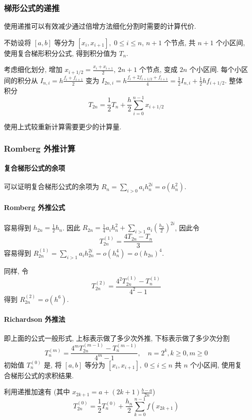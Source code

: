 \documentclass{ctexart}
\begin{document}
\subsubsection{梯形公式的递推}
    使用递推可以有效减少通过倍增方法细化分割时需要的计算代价.\par
    不妨设将 $[a,b]$ 等分为 $[x_i, x_{i+1}],\;0\le i\le n$, $n+1$ 个节点, 共 $n+1$ 个小区间,
    使用复合梯形积分公式, 得到积分值为 $T_n$.\par
    考虑细化划分, 增加 $x_{i+1/2} = \frac{x_i + x_{i+1}}{2}$, $2n+1$ 个节点, 变成 $2n$ 个小区间.
    每个小区间的积分从 $I_{n,i} = h \frac{f_i + f_{i+1}}{2}$ 变为 
    $I_{2n,i} = h\frac{f_i + 2 f_{i + 1/2} + f_{i+1}}{4} = \frac{1}{2} I_{n,i} + \frac{1}{2} h f_{i+1/2}$.
    整体积分 \[
        T_{2n} = \frac{1}{2} T_n + \frac{h}{2} \sum_{i=0}^{n-1} x_{i+1/2}\]
    \par
    使用上式较重新计算需要更少的计算量.
\subsubsection{Romberg 外推计算}
\paragraph{复合梯形公式的余项}
    可以证明复合梯形公式的余项为 $R_n = \sum_{i > 0} a_i h_n^{2 i} = o(h_n^2)$.
\paragraph{Romberg 外推公式}
    容易得到 $h_{2n} = \frac{1}{2} h_n$. 因此 
    $R_{2n} = \frac{1}{4} a_i h_n^2 + \sum_{i>1} a_i \left(\frac{h_n}{2}\right)^{2 i}$,
    因此令 \[
        T^{(1)}_{2n} = \frac{4 T_{2n} - T_n}{3}\]
    容易得到 $R^{(1)}_{2n} = \sum_{i > 1} a_i h_{2n}^{2 i} = o(h_n^4) = o(h_{2n})^4$.\par
    同样, 令 \[
        T^{(2)}_{2n} = \frac{4^2 T^{(1)}_{2n} - T^{(1)}_n}{4^2 - 1}\]
    得到 $R^{(2)}_{2n} = o(h^6)$.
\paragraph{Richardson 外推法}
    即上面的公式一般形式, 上标表示做了多少次外推, 下标表示做了多少次分割 \[
        T^{(m)}_n = \frac{4^m T^{(m-1)}_{2n} - T^{(m-1)}_n}{4^m -1},\quad n = 2^k, k \ge 0, m \ge 0\]
    初始值 $ T^{(0)}_n $ 是, 将 $[a,b]$ 等分为 $[x_i, x_{i+1}],\;0\le i \le n$ 共 $n$ 个小区间,
    使用复合梯形公式的求积结果.\par
    利用递推加速有 (其中 $x_{2k + 1} = a + (2 k + 1) \frac{b - a}{2n}$) \[
        T^{(0)}_{2n} = \frac{1}{2} T^{(0)}_n + \frac{h_n}{2} \sum_{k=0}^{n-1} f(x_{2 k + 1})\]
\end{document}
